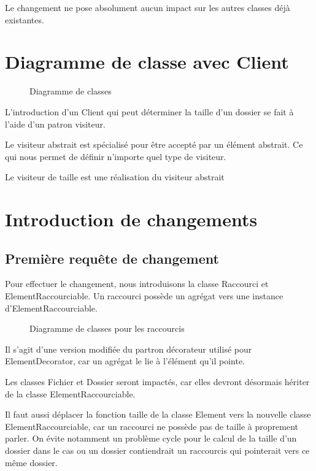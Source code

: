 \documentclass{article}
\begin{document}
  Le changement ne pose absolument aucun impact sur les autres classes déjà
  existantes.

  \section{Diagramme de classe avec \textsf{Client}}
  \begin{sidewaysfigure}
    \centering
    \resizebox{\textwidth}{!}{}
    \caption{Diagramme de classes}
  \end{sidewaysfigure}

  L'introduction d'un Client qui peut déterminer la taille d'un dossier se fait
  à l'aide d'un patron visiteur.

  Le visiteur abstrait est spécialisé pour être accepté par un élément abstrait.
  Ce qui nous permet de définir n'importe quel type de visiteur.

  Le visiteur de taille est une réalisation du visiteur abstrait

  \section{Introduction de changements}

  \subsection{Première requête de changement}
  Pour effectuer le changement, nous introduisons la classe \textsf{Raccourci}
  et \textsf{ElementRaccourciable}. Un raccourci possède un agrégat vers une
  instance d'\textsf{ElementRaccourciable}.

  \begin{figure}
    \centering
    \resizebox{\textwidth}{!}{}
    \caption{Diagramme de classes pour les raccourcis}
  \end{figure}

  Il s'agit d'une version modifiée du partron décorateur utilisé pour
  \textsf{ElementDecorator}, car un agrégat le lie à l'élément qu'il pointe.

  Les classes \textsf{Fichier} et \textsf{Dossier} seront impactés, car elles
  devront désormais hériter de la classe \textsf{ElementRaccourciable}.

  Il faut aussi déplacer la fonction \textsf{taille} de la classe
  \textsf{Element} vers la nouvelle classe \textsf{ElementRaccourciable}, car un
  raccourci ne possède pas de taille à proprement parler. On évite notamment un
  problème cycle pour le calcul de la taille d'un dossier dans le cas ou un
  dossier contiendrait un raccourcis qui pointerait vers ce même dossier.
\end{document}
